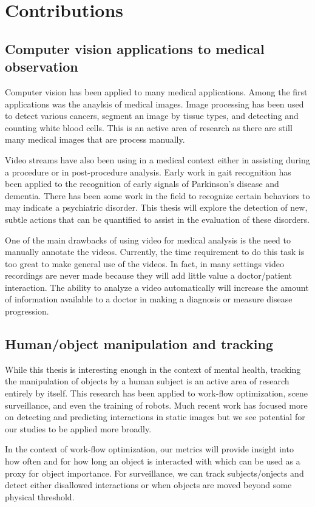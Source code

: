 \documentclass[11pt]{article}
\begin{document}
\section{Contributions}
\subsection{Computer vision applications to medical observation}
Computer vision has been applied to many medical applications. Among the first applications was the anaylsis of medical images. Image processing has been used to detect various cancers, segment an image by tissue types, and detecting and counting white blood cells. This is an active area of research as there are still many medical images that are process manually.

Video streams have also been using in a medical context either in assisting during a procedure or in post-procedure analysis. Early work in gait recognition has been applied to the recognition of early signals of Parkinson's disease and dementia. There has been some work in the field to recognize certain behaviors to may indicate a psychiatric disorder. This thesis will explore the detection of new, subtle actions that can be quantified to assist in the evaluation of these disorders.

One of the main drawbacks of using video for medical analysis is the need to manually annotate the videos. Currently, the time requirement to do this task is too great to make general use of the videos. In fact, in many settings video recordings are never made because they will add little value a doctor/patient interaction. The ability to analyze a video automatically will increase the amount of information available to a doctor in making a diagnosis or measure disease progression.
\subsection{Human/object manipulation and tracking}
While this thesis is interesting enough in the context of mental health, tracking the manipulation of objects by a human subject is an active area of research entirely by itself. This research has been applied to work-flow optimization, scene surveillance, and even the training of robots. Much recent work has focused more on detecting and predicting interactions in static images but we see potential for our studies to be applied more broadly.

In the context of work-flow optimization, our metrics will provide insight into how often and for how long an object is interacted with which can be used as a proxy for object importance. For surveillance, we can track subjects/onjects and detect either disallowed interactions or when objects are moved beyond some physical threshold.
\end{document}
